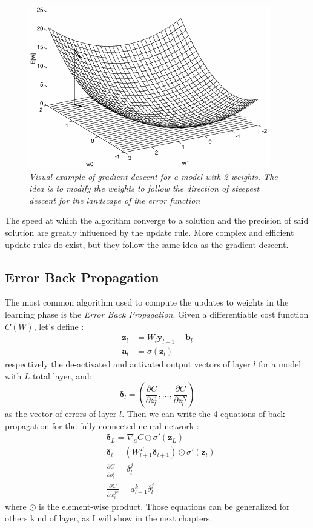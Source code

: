 \documentclass[12pt,a4paper]{report}
\begin{document}
\begin{figure}[h]
 \centering
 \includegraphics[scale=0.8]{./images/sgd.png}
 \caption{\it Visual example of gradient descent for a model with 2 weights. The idea is to modify the weights to follow the direction of steepest descent for the landscape of the error function}
 \label{fig:gd}
\end{figure}
The speed at which the algorithm converge to a solution and the precision of said solution are greatly influenced by the update rule. More complex and efficient update rules do exist, but they follow the same idea as the gradient descent.

\subsection*{Error Back Propagation}

The most common algorithm used to compute the updates to weights in the learning phase is the {\it Error Back Propagation}. 
Given a differentiable cost function $C(W)$, let's define :
\begin{align}
 \bm{z}_l &= W_l \bm{y}_{l-1} + \bm{b}_l  \\ 
 \bm{a}_l &= \sigma(\bm{z}_l)
\end{align}
respectively the de-activated and activated output vectors of layer $l$ for a model with $L$ total layer, and:
\begin{equation}
 \bm{\delta}_l = (\frac{\partial C}{\partial z_l^1}, \dots , \frac{\partial C}{\partial z_l^N}) 
\end{equation}
as the vector of errors of layer $l$. Then we can write the 4 equations of back propagation for the fully connected neural network \cite{neural-net-nielsen}:
\begin{align}
  &\bm{\delta}_L = \nabla_a C \odot \sigma'(\bm{z}_L) \\ 
  &\bm{\delta}_l = (W_{l+1}^T \bm{\delta}_{l+1}) \odot \sigma'(\bm{z}_l) \\
  &\frac{\partial C}{\partial b_l^j} = \delta_l^j \\
  &\frac{\partial C}{\partial w_l^{j k}} = a_{l-1}^k \delta_{l}^{j}
\end{align}
where  $\odot$ is the element-wise product.
Those equations can be generalized for others kind of layer, as I will show in the next chapters. 
\end{document}
